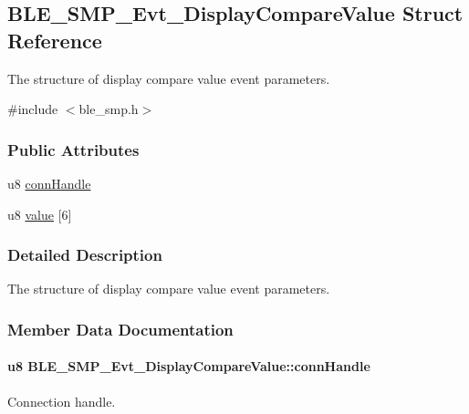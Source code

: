 \hypertarget{struct_b_l_e___s_m_p___evt___display_compare_value}{}\subsection{B\+L\+E\+\_\+\+S\+M\+P\+\_\+\+Evt\+\_\+\+Display\+Compare\+Value Struct Reference}
\label{struct_b_l_e___s_m_p___evt___display_compare_value}


The structure of display compare value event parameters.  




{\ttfamily \#include $<$ble\+\_\+smp.\+h$>$}

\subsubsection*{Public Attributes}
\begin{DoxyCompactItemize}
\item 
u8 \hyperlink{struct_b_l_e___s_m_p___evt___display_compare_value_ad22e41ce5792c13d1609515e87a3df58}{conn\+Handle}
\item 
u8 \hyperlink{struct_b_l_e___s_m_p___evt___display_compare_value_a89bfdab60435d17a48af90596c11d030}{value} \mbox{[}6\mbox{]}
\end{DoxyCompactItemize}


\subsubsection{Detailed Description}
The structure of display compare value event parameters. 

\subsubsection{Member Data Documentation}
\paragraph[{\texorpdfstring{conn\+Handle}{connHandle}}]{\setlength{\rightskip}{0pt plus 5cm}u8 B\+L\+E\+\_\+\+S\+M\+P\+\_\+\+Evt\+\_\+\+Display\+Compare\+Value\+::conn\+Handle}\hypertarget{struct_b_l_e___s_m_p___evt___display_compare_value_ad22e41ce5792c13d1609515e87a3df58}{}\label{struct_b_l_e___s_m_p___evt___display_compare_value_ad22e41ce5792c13d1609515e87a3df58}
Connection handle. 
